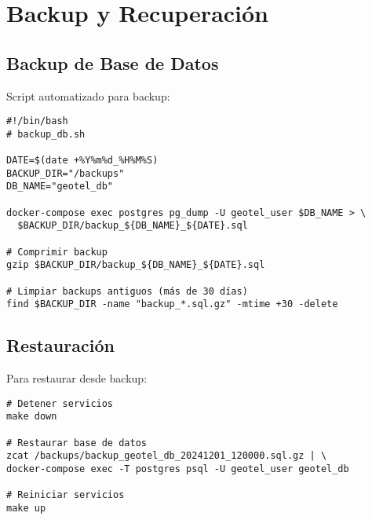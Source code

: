 \section{Backup y Recuperación}

\subsection{Backup de Base de Datos}

Script automatizado para backup:

\begin{verbatim}
#!/bin/bash
# backup_db.sh

DATE=$(date +%Y%m%d_%H%M%S)
BACKUP_DIR="/backups"
DB_NAME="geotel_db"

docker-compose exec postgres pg_dump -U geotel_user $DB_NAME > \
  $BACKUP_DIR/backup_${DB_NAME}_${DATE}.sql

# Comprimir backup
gzip $BACKUP_DIR/backup_${DB_NAME}_${DATE}.sql

# Limpiar backups antiguos (más de 30 días)
find $BACKUP_DIR -name "backup_*.sql.gz" -mtime +30 -delete
\end{verbatim}

\subsection{Restauración}

Para restaurar desde backup:

\begin{verbatim}
# Detener servicios
make down

# Restaurar base de datos
zcat /backups/backup_geotel_db_20241201_120000.sql.gz | \
docker-compose exec -T postgres psql -U geotel_user geotel_db

# Reiniciar servicios
make up
\end{verbatim}

